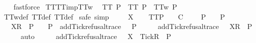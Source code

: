 \begin{isabellebody}
\ \ \isamarkupfalse%
\ fastforce%
\endisatagproof
{\isafoldproof}%
%
\isadelimproof
\isanewline
%
\endisadelimproof
\isanewline
{}\isamarkupfalse%
\ TT{}{\isacharunderscore}TT{}{\isacharunderscore}imp{\isacharunderscore}TT{}w{\isacharcolon}\isanewline
\ \ {\isachardoublequoteopen}TT{}\ P\ {\isasymLongrightarrow}\ TT{}\ P\ {\isasymLongrightarrow}\ TT{}w\ P{\isachardoublequoteclose}\isanewline
%
\isadelimproof
\ \ %
\endisadelimproof
%
\isatagproof
{}\isamarkupfalse%
\ TT{}w{\isacharunderscore}def\ TT{}{\isacharunderscore}def\ TT{}{\isacharunderscore}def\isanewline
{}\isamarkupfalse%
\ {\isacharparenleft}safe{\isacharcomma}\ simp{\isacharparenright}\isanewline
\ \ \isamarkupfalse%
\ {\isasymrho}\ X\isanewline
\ \ \isamarkupfalse%
\ TT{}{\isacharunderscore}P{\isacharcolon}\ {\isachardoublequoteopen}{\isasymforall}{\isasymrho}{\isachardot}\ {\isacharparenleft}{\isasymexists}{\isasymsigma}{\isachardot}\ {\isasymrho}\ {\isasymlesssim}\isactrlsub C\ {\isasymsigma}\ {\isasymand}\ {\isasymsigma}\ {\isasymin}\ P{\isacharparenright}\ {\isasymlongrightarrow}\ {\isasymrho}\ {\isasymin}\ P{\isachardoublequoteclose}\isanewline
\ \ \isamarkupfalse%
\ {\isachardoublequoteopen}{\isasymrho}\ {\isacharat}\ {\isacharbrackleft}{\isacharbrackleft}X{\isacharbrackright}\isactrlsub R{\isacharbrackright}\ {\isasymin}\ P{\isachardoublequoteclose}\ {\isachardoublequoteopen}{\isasymforall}{\isasymrho}{\isachardot}\ {\isasymrho}\ {\isasymin}\ P\ {\isasymlongrightarrow}\ add{\isacharunderscore}Tick{\isacharunderscore}refusal{\isacharunderscore}trace\ {\isasymrho}\ {\isasymin}\ P{\isachardoublequoteclose}\isanewline
\ \ \isamarkupfalse%
\ \isamarkupfalse%
\ {\isachardoublequoteopen}add{\isacharunderscore}Tick{\isacharunderscore}refusal{\isacharunderscore}trace\ {\isacharparenleft}{\isasymrho}\ {\isacharat}\ {\isacharbrackleft}{\isacharbrackleft}X{\isacharbrackright}\isactrlsub R{\isacharbrackright}{\isacharparenright}\ {\isasymin}\ P{\isachardoublequoteclose}\isanewline
\ \ \ \ \isamarkupfalse%
\ auto\isanewline
\ \ \isamarkupfalse%
\ \isamarkupfalse%
\ {\isachardoublequoteopen}add{\isacharunderscore}Tick{\isacharunderscore}refusal{\isacharunderscore}trace\ {\isasymrho}\ {\isacharat}\ {\isacharbrackleft}{\isacharbrackleft}X\ {\isasymunion}\ {\isacharbraceleft}Tick{\isacharbraceright}{\isacharbrackright}\isactrlsub R{\isacharbrackright}\ {\isasymin}\ P{\isachardoublequoteclose}\isanewline

\end{isabellebody}
